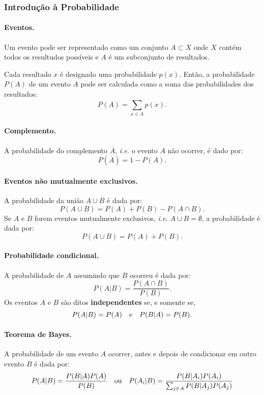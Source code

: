 \subsubsection{Introdução à Probabilidade}
\paragraph{Eventos.} Um evento pode ser representado como um conjunto $A \subset X$ onde $X$ contém todos os resultudos possíveis e $A$ é um subconjunto de resultados.

Cada resultado $x$ é designado uma probabilidade $p(x)$. Então, a probabilidade $P(A)$ de um evento $A$ pode ser calculada como a soma das probabilidades dos resultados:
$$P(A) = \sum_{x \in A}^{} p(x).$$

\paragraph{Complemento.} A probabilidade do complemento $\overline{A}$, \textit{i.e.} o evento $A$ não ocorrer, é dado por:
$$P(\overline{A}) = 1 - P(A).$$

\paragraph{Eventos não mutualmente exclusivos.} A probabilidade da união $A\cup B$ é dada por:
$$P(A\cup B) = P(A) + P(B) - P(A\cap B).$$
Se $A$ e $B$ forem eventos mutualmente exclusivos, \textit{i.e.} $A \cup B = \emptyset$, a probabilidade é dada por:
$$P(A\cup B) = P(A) + P(B).$$

\paragraph{Probabilidade condicional.} A probabilidade de $A$ assumindo que $B$ ocorreu é dada por:
$$P(A|B) = \frac{P(A \cap B)}{P(B)}.$$
Os eventos $A$ e $B$ são ditos \textbf{independentes} se, e somente se,
$$P(A|B) = P(A) \quad \textnormal{e} \quad P(B|A) = P(B).$$

\paragraph{Teorema de Bayes.} A probabilidade de um evento $A$ ocorrer, antes e depois de condicionar em outro evento $B$ é dada por:
$$P(A|B) = \frac{P(B|A)P(A)}{P(B)} \quad \textnormal{ou} \quad P(A_i|B) = \frac{P(B|A_i)P(A_i)}{\sum_{j \in A}^{} P(B|A_j)P(A_j)}$$

